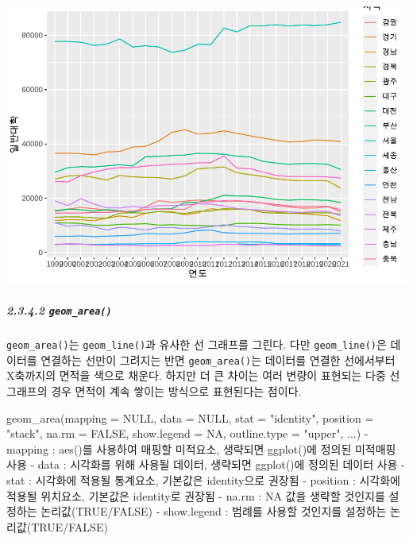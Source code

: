 \documentclass[
]{article}
\newenvironment{Shaded}{\begin{snugshade}}{\end{snugshade}}
\newcommand{\AttributeTok}[1]{\textcolor[rgb]{0.77,0.63,0.00}{#1}}
\newcommand{\ConstantTok}[1]{\textcolor[rgb]{0.00,0.00,0.00}{#1}}
\newcommand{\FunctionTok}[1]{\textcolor[rgb]{0.00,0.00,0.00}{#1}}
\newcommand{\NormalTok}[1]{#1}
\newcommand{\SpecialCharTok}[1]{\textcolor[rgb]{0.00,0.00,0.00}{#1}}
\newcommand{\StringTok}[1]{\textcolor[rgb]{0.31,0.60,0.02}{#1}}
\begin{document}
\includegraphics{chap3_files/figure-latex/unnamed-chunk-48-1.pdf}

\hypertarget{geom_area}{%
\subparagraph{\texorpdfstring{2.3.4.2 \texttt{geom\_area()}}{2.3.4.2 geom\_area()}}\label{geom_area}}

\texttt{geom\_area()}는 \texttt{geom\_line()}과 유사한 선 그래프를 그린다. 다만 \texttt{geom\_line()}은 데이터를 연결하는 선만이 그려지는 반면 \texttt{geom\_area()}는 데이터를 연결한 선에서부터 X축까지의 면적을 색으로 채운다. 하지만 더 큰 차이는 여러 변량이 표현되는 다중 선 그래프의 경우 면적이 계속 쌓이는 방식으로 표현된다는 점이다.

\begin{Shaded}
\begin{Highlighting}[]
\FunctionTok{geom\_area}\NormalTok{(}\AttributeTok{mapping =} \ConstantTok{NULL}\NormalTok{, }\AttributeTok{data =} \ConstantTok{NULL}\NormalTok{, }\AttributeTok{stat =} \StringTok{"identity"}\NormalTok{, }\AttributeTok{position =} \StringTok{"stack"}\NormalTok{, }\AttributeTok{na.rm =} \ConstantTok{FALSE}\NormalTok{, }\AttributeTok{show.legend =} \ConstantTok{NA}\NormalTok{, }\AttributeTok{outline.type =} \StringTok{"upper"}\NormalTok{, ...)}
  \SpecialCharTok{{-}}\NormalTok{ mapping }\SpecialCharTok{:} \FunctionTok{aes}\NormalTok{()를 사용하여 매핑할 미적요소, 생략되면 }\FunctionTok{ggplot}\NormalTok{()에 정의된 미적매핑 사용}
  \SpecialCharTok{{-}}\NormalTok{ data }\SpecialCharTok{:}\NormalTok{ 시각화를 위해 사용될 데이터, 생략되면 }\FunctionTok{ggplot}\NormalTok{()에 정의된 데이터 사용}
  \SpecialCharTok{{-}}\NormalTok{ stat }\SpecialCharTok{:}\NormalTok{ 시각화에 적용될 통계요소, 기본값은 }\StringTok{\textquotesingle{}identity\textquotesingle{}}\NormalTok{으로 권장됨}
  \SpecialCharTok{{-}}\NormalTok{ position }\SpecialCharTok{:}\NormalTok{ 시각화에 적용될 위치요소, 기본값은 }\StringTok{\textquotesingle{}identity\textquotesingle{}}\NormalTok{로 권장됨}
  \SpecialCharTok{{-}}\NormalTok{ na.rm }\SpecialCharTok{:} \ConstantTok{NA}\NormalTok{ 값을 생략할 것인지를 설정하는 논리값(}\ConstantTok{TRUE}\SpecialCharTok{/}\ConstantTok{FALSE}\NormalTok{)}
  \SpecialCharTok{{-}}\NormalTok{ show.legend }\SpecialCharTok{:}\NormalTok{ 범례를 사용할 것인지를 설정하는 논리값(}\ConstantTok{TRUE}\SpecialCharTok{/}\ConstantTok{FALSE}\NormalTok{) }
\end{Highlighting}
\end{Shaded}
\end{document}
